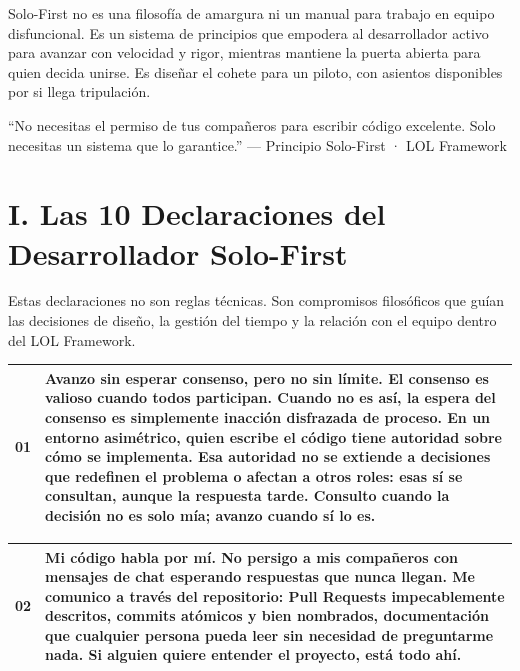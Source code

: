\documentclass[14pt,a4paper,oneside]{extbook}
\begin{document}
Solo-First no es una filosofía de amargura ni un manual para trabajo en equipo disfuncional. Es un sistema de principios que empodera al desarrollador activo para avanzar con velocidad y rigor, mientras mantiene la puerta abierta para quien decida unirse. Es diseñar el cohete para un piloto, con asientos disponibles por si llega tripulación.



\begin{authorobservation}
\enquote{No necesitas el permiso de tus compañeros para escribir código excelente. Solo necesitas un sistema que lo garantice.} — Principio Solo-First · LOL Framework
\end{authorobservation}



\section{I. Las 10 Declaraciones del Desarrollador Solo-First}

Estas declaraciones no son reglas técnicas. Son compromisos filosóficos que guían las decisiones de diseño, la gestión del tiempo y la relación con el equipo dentro del LOL Framework.



\begin{table}[htbp]
\centering
\begin{tabular}{p{} p{}}
\toprule
\textbf{01} & \textbf{Avanzo sin esperar consenso, pero no sin límite. El consenso es valioso cuando todos participan. Cuando no es así, la espera del consenso es simplemente inacción disfrazada de proceso. En un entorno asimétrico, quien escribe el código tiene autoridad sobre cómo se implementa. Esa autoridad no se extiende a decisiones que redefinen el problema o afectan a otros roles: esas sí se consultan, aunque la respuesta tarde. Consulto cuando la decisión no es solo mía; avanzo cuando sí lo es.} \\
\midrule
\bottomrule
\end{tabular}
\end{table}



\begin{table}[htbp]
\centering
\begin{tabular}{p{} p{}}
\toprule
\textbf{02} & \textbf{Mi código habla por mí. No persigo a mis compañeros con mensajes de chat esperando respuestas que nunca llegan. Me comunico a través del repositorio: Pull Requests impecablemente descritos, commits atómicos y bien nombrados, documentación que cualquier persona pueda leer sin necesidad de preguntarme nada. Si alguien quiere entender el proyecto, está todo ahí.} \\
\midrule
\bottomrule
\end{tabular}
\end{table}
\end{document}
